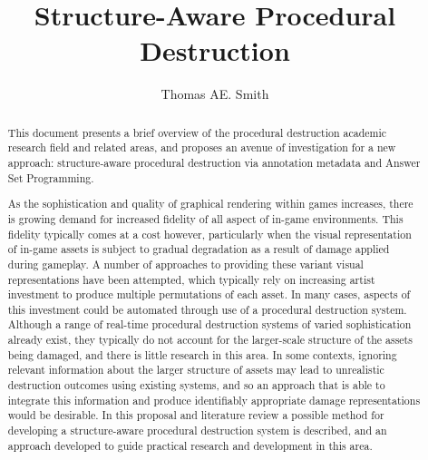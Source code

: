\documentclass[11pt]{report}
\title{Structure-Aware Procedural Destruction} \author{Thomas AE. Smith}
\begin{document}
\maketitle

\begin{abstract} %
	This document presents a brief overview of the procedural destruction academic research field and related areas, and proposes an avenue of investigation for a new approach: structure-aware procedural destruction via annotation metadata and Answer Set Programming.

	As the sophistication and quality of graphical rendering within games increases, there is growing demand for increased fidelity of all aspect of in-game environments. This fidelity typically comes at a cost however, particularly when the visual representation of in-game assets is subject to gradual degradation as a result of damage applied during gameplay. A number of approaches to providing these variant visual representations have been attempted, which typically rely on increasing artist investment to produce multiple permutations of each asset. In many cases, aspects of this investment could be automated through use of a procedural destruction system.
	Although a range of real-time procedural destruction systems of varied sophistication already exist, they typically do not account for the larger-scale structure of the assets being damaged, and there is little research in this area.
	In some contexts, ignoring relevant information about the larger structure of assets may lead to unrealistic destruction outcomes using existing systems, and so an approach that is able to integrate this information and produce identifiably appropriate damage representations would be desirable.
	In this proposal and literature review a possible method for developing a structure-aware procedural destruction system is described, and an approach developed to guide practical research and development in this area.
\end{abstract}
\end{document}
